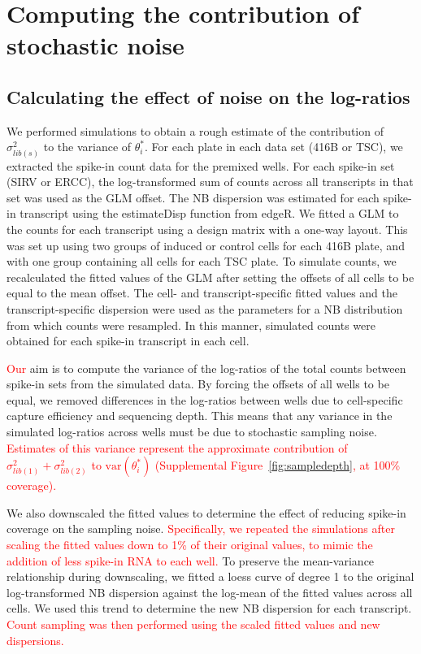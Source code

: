 \documentclass{article}
\newcommand\revised[1]{\textcolor{red}{#1}}
\newcommand\variance{\mbox{var}}
\begin{document}
\section{Computing the contribution of stochastic noise}

\subsection{Calculating the effect of noise on the log-ratios}
We performed simulations to obtain a rough estimate of the contribution of $\sigma^2_{lib(s)}$ to the variance of $\theta^*_i$.
For each plate in each data set (416B or TSC), we extracted the spike-in count data for the premixed wells.
For each spike-in set (SIRV or ERCC), the log-transformed sum of counts across all transcripts in that set was used as the GLM offset. 
The NB dispersion was estimated for each spike-in transcript using the estimateDisp function from edgeR.
We fitted a GLM to the counts for each transcript using a design matrix with a one-way layout.
This was set up using two groups of induced or control cells for each 416B plate, and with one group containing all cells for each TSC plate.
To simulate counts, we recalculated the fitted values of the GLM after setting the offsets of all cells to be equal to the mean offset.
The cell- and transcript-specific fitted values and the transcript-specific dispersion were used as the parameters for a NB distribution from which counts were resampled.
In this manner, simulated counts were obtained for each spike-in transcript in each cell.

\revised{Our} aim is to compute the variance of the log-ratios of the total counts between spike-in sets from the simulated data.
By forcing the offsets of all wells to be equal, we removed differences in the log-ratios between wells due to cell-specific capture efficiency and sequencing depth.
This means that any variance in the simulated log-ratios across wells must be due to stochastic sampling noise.
\revised{Estimates of this variance represent the approximate contribution of $\sigma^2_{lib(1)} + \sigma^2_{lib(2)}$ to $\variance(\theta^*_i)$ (Supplemental Figure~\ref{fig:sampledepth}, at 100\% coverage).}

We also downscaled the fitted values to determine the effect of reducing spike-in coverage on the sampling noise.
\revised{Specifically, we repeated the simulations after scaling the fitted values down to 1\% of their original values, to mimic the addition of less spike-in RNA to each well.}
To preserve the mean-variance relationship during downscaling, we fitted a loess curve of degree 1 to the original log-transformed NB dispersion against the log-mean of the fitted values across all cells.
We used this trend to determine the new NB dispersion for each transcript.
\revised{Count sampling was then performed using the scaled fitted values and new dispersions.}
\end{document}
